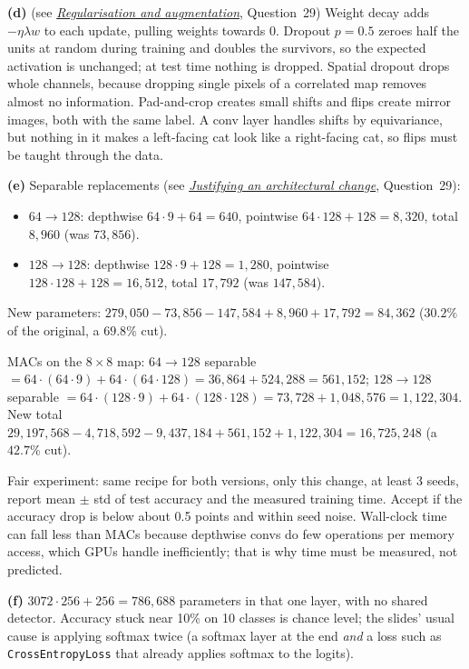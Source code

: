 \documentclass[12pt,a4paper]{article}
\newcommand{\seeconcept}[3]{(see \hyperref[#1]{\textit{#2}}, Question~#3)}
\begin{document}
\textbf{(d)} \seeconcept{c:regularise}{Regularisation and augmentation}{29} Weight decay adds $-\eta\lambda w$ to each update, pulling weights towards 0. Dropout $p=0.5$ zeroes half the units at random during training and doubles the survivors, so the expected activation is unchanged; at test time nothing is dropped. Spatial dropout drops whole channels, because dropping single pixels of a correlated map removes almost no information. Pad-and-crop creates small shifts and flips create mirror images, both with the same label. A conv layer handles shifts by equivariance, but nothing in it makes a left-facing cat look like a right-facing cat, so flips must be taught through the data.

\textbf{(e)} Separable replacements \seeconcept{c:ablation}{Justifying an architectural change}{29}:
\begin{itemize}[nosep]
\item $64\to128$: depthwise $64\cdot9+64=640$, pointwise $64\cdot128+128=8{,}320$, total $8{,}960$ (was $73{,}856$).
\item $128\to128$: depthwise $128\cdot9+128=1{,}280$, pointwise $128\cdot128+128=16{,}512$, total $17{,}792$ (was $147{,}584$).
\end{itemize}
New parameters: $279{,}050-73{,}856-147{,}584+8{,}960+17{,}792=84{,}362$ ($30.2\%$ of the original, a $69.8\%$ cut).

MACs on the $8\times8$ map: $64\to128$ separable $=64\cdot(64\cdot9)+64\cdot(64\cdot128)=36{,}864+524{,}288=561{,}152$; $128\to128$ separable $=64\cdot(128\cdot9)+64\cdot(128\cdot128)=73{,}728+1{,}048{,}576=1{,}122{,}304$. New total $29{,}197{,}568-4{,}718{,}592-9{,}437{,}184+561{,}152+1{,}122{,}304=16{,}725{,}248$ (a $42.7\%$ cut).

Fair experiment: same recipe for both versions, only this change, at least 3 seeds, report mean $\pm$ std of test accuracy and the measured training time. Accept if the accuracy drop is below about 0.5 points and within seed noise. Wall-clock time can fall less than MACs because depthwise convs do few operations per memory access, which GPUs handle inefficiently; that is why time must be measured, not predicted.

\textbf{(f)} $3072\cdot256+256=786{,}688$ parameters in that one layer, with no shared detector. Accuracy stuck near 10\% on 10 classes is chance level; the slides' usual cause is applying softmax twice (a softmax layer at the end \emph{and} a loss such as \texttt{CrossEntropyLoss} that already applies softmax to the logits).
\end{document}
